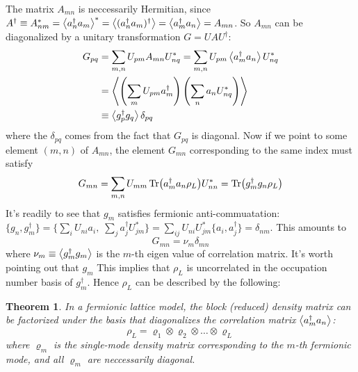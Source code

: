 \documentclass[11pt]{article}
\newtheorem{thm}{Theorem}
\theoremstyle{remark}
\theoremstyle{definition}
\begin{document}
The matrix $A_{mn}$ is neccessarily Hermitian, since $A^\dagger \equiv A_{nm}^* = \expval{a_n^\dagger a_m}^* = \expval{(a_n^\dagger a_m)^\dagger} = \expval{a_m^\dagger a_n} = A_{mn}$. So $A_{mn}$ can be diagonalized by a unitary transformation $G = UAU^\dagger$:
\begin{equation}
	\begin{split}
		G_{pq} &= \sum_{m,n} U_{pm} A_{mn} U_{nq}^* = \sum_{m,n} U_{pm}\expval{a_m^\dagger a_n} U_{nq}^*\\
		       &= \expval{\left(\sum_{m} U_{pm} a_m^\dagger\right) \left(\sum_{n} a_n U_{nq}^*\right)  } \\
		       &\equiv \expval{g_p^\dagger g_q}\delta_{pq}
	\end{split}
\end{equation}
where the $\delta_{pq}$ comes from the fact that  $G_{pq}$ is diagonal. Now if we point to some element  $(m,n)$ of  $A_{mn}$, the element  $G_{mn}$ corresponding to the same index must satisfy
\begin{equation}
	G_{mn} = \sum_{m,n} U_{mm} \Tr(a_m^\dagger a_n \rho_L)U_{nn}^*  = \Tr(g_m^\dagger g_n \rho_L)
\end{equation}
It's readily to see that $g_m$ satisfies fermionic anti-commuatation:  $\{g_n, g_m^\dagger\} = \{\sum_{i}U_{ni} a_i,\; \sum_{j} a_j^\dagger U_{jm}^*  \} = \sum_{ij} U_{ni} U_{jm}^* \{a_i, a_j^\dagger\}  = \delta_{nm}$. This amounts to
\begin{equation}
	G_{mn} = \nu_{m} \delta_{mn} 
\end{equation}
where $\nu_m \equiv\expval{g_m^\dagger g_m}$ is the $m$-th eigen value of correlation matrix. It's worth pointing out that $g_m$  This implies that  $\rho_L$ is uncorrelated in the occupation number basis of $g_m^\dagger$. Hence  $\rho_L$ can be described by the following:
\begin{thm} \label{thm3}
	In a fermionic lattice model, the block (reduced) density matrix can be factorized under the basis that diagonalizes the correlation matrix $\expval{a_m^\dagger a_n}$:
\begin{equation}
	\rho_L = \varrho_1 \otimes \varrho_2 \otimes \ldots \otimes \varrho_L
\end{equation}
	where $\varrho_m$ is the single-mode density matrix corresponding to the $m$-th fermionic mode, and all $\varrho_m$ are neccessarily diagonal.  
\end{thm}
\end{document}
